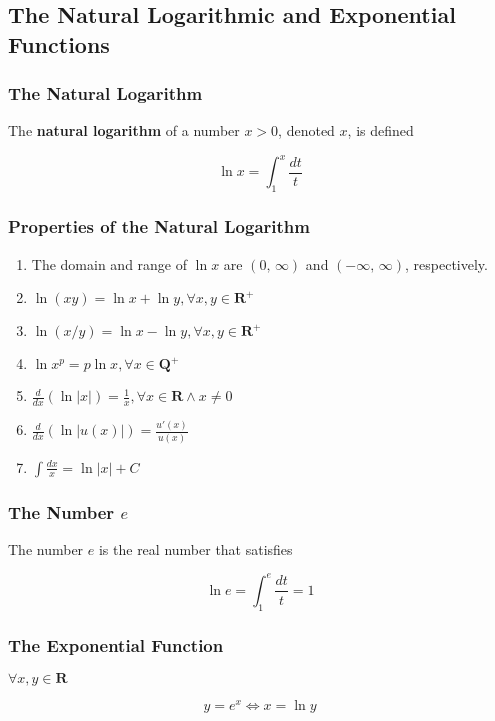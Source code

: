 \subsection{The Natural Logarithmic and Exponential Functions}
\subsubsection{The Natural Logarithm}
The \textbf{natural logarithm} of a number $x > 0$, denoted $x$, is defined

\begin{equation}
\ln x = \int ^x _1 \frac{dt}{t}
\end{equation}

\subsubsection{Properties of the Natural Logarithm}
\begin{enumerate}
\item The domain and range of $\ln x$ are $(0,\, \infty)$ and $(- \infty,\, \infty)$, respectively.
\item $\ln (xy) = \ln x + \ln y, \forall x, y \in \mathbf{R}^+$
\item $\ln (x / y) = \ln x - \ln y, \forall x, y \in \mathbf{R}^+$
\item $\ln x^p = p \ln x, \forall x \in \mathbf{Q}^+$
\item $\frac{d}{dx} (\ln |x|) = \frac{1}{x}, \forall x \in \mathbf{R} \wedge x \neq 0$
\item $\frac{d}{dx} (\ln |u(x)|) = \frac{u'(x)}{u(x)}$
\item $\int \frac{dx}{x} = \ln |x| + C$
\end{enumerate}

\subsubsection{The Number $e$}
The number $e$ is the real number that satisfies

\begin{equation}
\ln e = \int _1 ^e \frac{dt}{t} = 1
\end{equation}


\subsubsection{The Exponential Function}
$\forall x, y \in \mathbf{R}$

\begin{equation}
y = e^x \Leftrightarrow x = \ln y
\end{equation}

